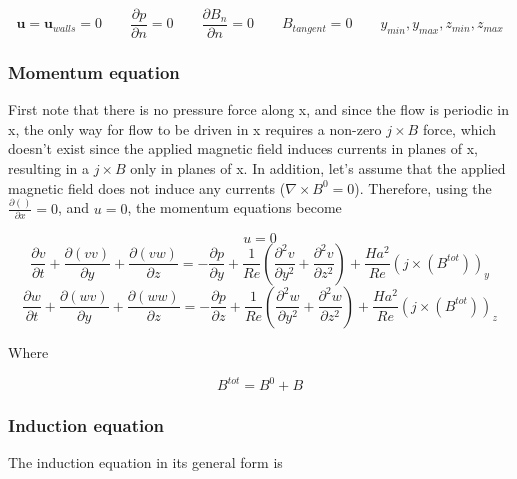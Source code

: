 \documentclass[11pt]{article}
\begin{document}
\begin{equation}
	\pmb{u} = \pmb{u}_{walls} = 0
	\qquad
	\frac{\partial p}{\partial n} = 0
	\qquad
	\frac{\partial B_{n}}{\partial n} = 0
	\qquad
	B_{tangent} = 0
	\qquad
	y_{min},y_{max},
	z_{min},z_{max}
\end{equation}

\subsubsection{Momentum equation}

First note that there is no pressure force along x, and since the flow is periodic in x, the only way for flow to be driven in x requires a non-zero $j\times B$ force, which doesn't exist since the applied magnetic field induces currents in planes of x, resulting in a $j\times B$ only in planes of x. In addition, let's assume that the applied magnetic field does not induce any currents ($\nabla \times B^0=0$). Therefore, using the $\frac{\partial ()}{\partial x} = 0$, and $u = 0$, the momentum equations become

\begin{equation}
	u=0
\end{equation}
\begin{equation}
	\frac{\partial v}{\partial t} 
	+ \frac{\partial (v v)}{\partial y}
	+ \frac{\partial (v w)}{\partial z}
	= 
	- \frac{\partial p}{\partial y}
	+ \frac{1}{Re}
	\left(
	\frac{\partial^2 v}{\partial y^2}
	+\frac{\partial^2 v}{\partial z^2}
	\right)
	+ \frac{Ha^2}{Re}
	(j \times (B^{tot}))_y
\end{equation}
\begin{equation}
	\frac{\partial w}{\partial t} 
	+ \frac{\partial (w v)}{\partial y}
	+ \frac{\partial (w w)}{\partial z}
	= 
	- \frac{\partial p}{\partial z}
	+ \frac{1}{Re}
	\left(
	\frac{\partial^2 w}{\partial y^2}
	+\frac{\partial^2 w}{\partial z^2}
	\right)
	+ \frac{Ha^2}{Re}
	(j \times (B^{tot}))_z
\end{equation}

Where

\begin{equation}
	B^{tot} = B^0 + B
\end{equation}

\subsubsection{Induction equation}

The induction equation in its general form is
\end{document}
